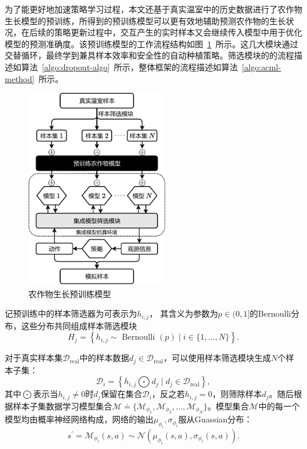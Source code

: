 为了能更好地加速策略学习过程，本文还基于真实温室中的历史数据进行了农作物生长模型的预训练，所得到的预训练模型可以更有效地辅助预测农作物的生长状况，在后续的策略更新过程中，交互产生的实时样本又会继续传入模型中用于优化模型的预测准确度。该预训练模型的工作流程结构如图~\ref{fig:pre-train-model}~所示。这几大模块通过交替循环，最终学到兼具样本效率和安全性的自动种植策略。筛选模块的的流程描述如算法~\ref{algo:dropout-algo}~所示，整体框架的流程描述如算法~\ref{algo:acml-method}~所示。

\begin{figure}[ht]
\centering
\includegraphics[width=0.55\textwidth]{figures/pre-train-model.pdf}
\caption{农作物生长预训练模型}
\label{fig:pre-train-model}
\end{figure}

记预训练中的样本筛选器为可表示为$h_{i,j}$， 其含义为参数为$p\in(0, 1]$的Bernoulli分布，这些分布共同组成样本筛选模块
\begin{equation}
    H_{j}=\left\{h_{i,j} \sim \text { Bernoulli }(p) \mid i \in\{1, \ldots, N\}\right\}.
\end{equation}

对于真实样本集$\mathcal{D}_{\text{real}}$中的样本数据$d_j\in\mathcal{D}_{\text{real}}$，可以使用样本筛选模块生成$N$个样本子集：
\begin{equation}
    \mathcal{D}_i=\left\{h_{i,j}\bigodot d_j\mid d_j\in\mathcal{D}_{\text{real}}\right\},
\end{equation}
其中$\bigodot$表示当$h_{i,j}\neq 0$时$d_j$保留在集合$\mathcal{D}_i$，反之若$h_{i,j}=0$，则筛除样本$d_j$。随后根据样本子集数据学习模型集合$\mathcal{M} \doteq \{\mathcal{M}_{\phi_1},\mathcal{M}_{\phi_2},\ldots,\mathcal{M}_{\phi_N}\}$。模型集合$\mathcal{M}$中的每一个模型均由概率神经网络构成，网络的输出$\mu_{\phi_i},\sigma_{\phi_i}$服从Guassian分布：
\begin{equation}
    s^\prime = \mathcal{M}_{\phi_i}(s,a) \sim \mathcal{N}(\mu_{\phi_i}(s,a),\sigma_{\phi_i}(s,a)).
\end{equation}


